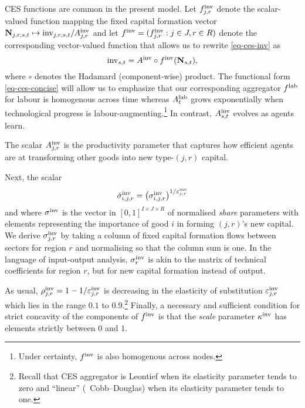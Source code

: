 \documentclass[12pt,a4paper,twoside, draft]{article}
\begin{document}
\begin{remark*}
  CES functions are common in the present
  model. 
  Let $f_{j, r}^{\textup{inv}}$ denote the scalar-valued
  function mapping the fixed capital formation vector
  $ \mathbf{N}_{j, r, {s}, t} \mapsto
  \textup{inv}_{j, r, {s}, t} / A_{j, r}^{\textup{inv}}$
  and let $f^{\textup{inv}} = (f_{j, r}^{\textup{inv}}: j \in J, r \in R )$
  denote the corresponding vector-valued function that allows us to rewrite
  \eqref{eq-ces-inv} as
  \begin{equation}\label{eq-ces-concise}
  \textup{inv}_{{s}, t} = A^{\textup{inv}}
    \circ f^{\textup{inv}}(\mathbf{N}_{{s}, t}),
  \end{equation}
  where $\circ$ denotes the Hadamard (component-wise) product.
  The functional form \cref{eq-ces-concise} will allow us to emphasize that our
  corresponding aggregator $f^{\textup{lab}}$ for labour is homogenous across
  time whereas $A_{t}^{\textup{lab}}$ grows exponentially when technological
  progress is labour-augmenting.\footnote{
    Under certainty, $f^{\textup{inv}}$ is also homogenous across nodes.
  }
  In contrast, $A_{{s}, t}^{\textup{inv}}$ evolves as agents learn.
\end{remark*}
The scalar $A_{j, r}^{\textup{inv}}$ is the productivity parameter that captures
how efficient agents are at transforming other goods into new type-$(j,r)$
capital.

Next, the scalar
\[
  \acute \sigma_{i,j, r}^{\textup{inv}}
  = \left( \sigma_{i,j, r}^{\textup{inv}} \right)
    ^ {1 / \varepsilon_{j, r}^{\textup{inv}}}
\]
and where $\sigma^{\textup{inv}}$ is the vector in
$[0, 1]^{I \times J \times R}$ of normalised \emph{share} parameters with
elements representing the importance of good $i$ in forming $(j, r)$'s new
capital.
We derive $\sigma_{j, r}^{\textup{inv}}$ by taking a column of fixed capital
formation flows between sectors for region $r$ and normalising so that the
column sum is one.
In the language of input-output analysis, $\sigma_{r}^{\textup{inv}}$ is akin
to the matrix of technical coefficients for region $r$, but for new capital
formation instead of output.

As usual,
$\rho_{j, r}^{\textup{inv}} = 1 - 1 / \varepsilon_{j, r}^{\textup{inv}}$ is
decreasing in the elasticity of substitution $\varepsilon_{j, r}^{\textup{inv}}$
which lies in the range $ 0.1 $ to $0.9$.\footnote{
  Recall that CES aggregator is Leontief when its elasticity
  parameter tends to zero and ``linear'' (\ie\ Cobb--Douglas) when its
  elasticity parameter tends to one.
}
Finally, a necessary and sufficient condition
\citep[Theorem 2]{Kojic-Concavity} for strict concavity of the
components of $f^{\textup{inv}}$ is that the \emph{scale} parameter
$\kappa^\textup{inv}$ has elements strictly between $0$ and $1$.
\end{document}
